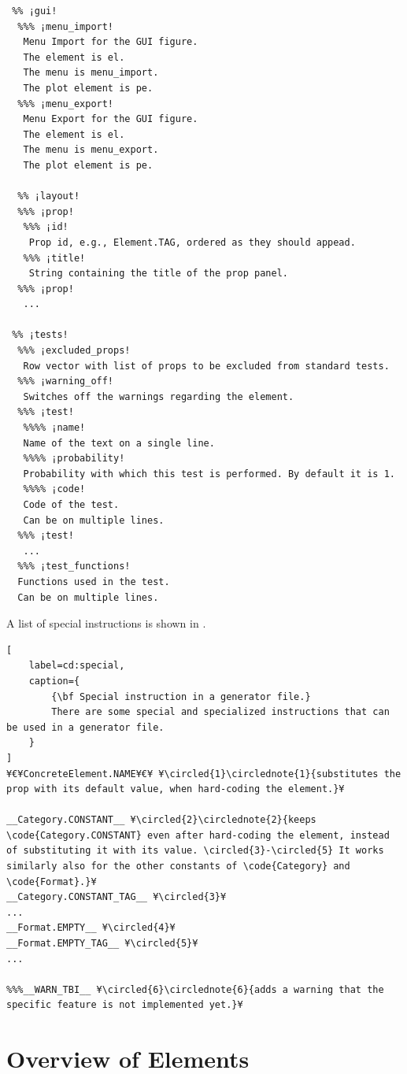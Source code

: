 \documentclass{tufte-handout}
\begin{document}
\begin{fullwidth}
\begin{lstlisting}
 %% ¡gui!
  %%% ¡menu_import!
   Menu Import for the GUI figure. 
   The element is el.
   The menu is menu_import.
   The plot element is pe.
  %%% ¡menu_export!
   Menu Export for the GUI figure. 
   The element is el.
   The menu is menu_export.
   The plot element is pe.

  %% ¡layout!
  %%% ¡prop!
   %%% ¡id!
    Prop id, e.g., Element.TAG, ordered as they should appead.
   %%% ¡title!
    String containing the title of the prop panel.
  %%% ¡prop!
   ...
  
 %% ¡tests!
  %%% ¡excluded_props!
   Row vector with list of props to be excluded from standard tests.
  %%% ¡warning_off!
   Switches off the warnings regarding the element.
  %%% ¡test!
   %%%% ¡name!
   Name of the text on a single line.
   %%%% ¡probability!
   Probability with which this test is performed. By default it is 1.
   %%%% ¡code!
   Code of the test.
   Can be on multiple lines.
  %%% ¡test!
   ...
  %%% ¡test_functions!
  Functions used in the test.
  Can be on multiple lines.
\end{lstlisting}
\end{fullwidth}

A list of special instructions is shown in .
%
\begin{lstlisting}[
	label=cd:special,
	caption={
		{\bf Special instruction in a generator file.}
		There are some special and specialized instructions that can be used in a generator file.
	}
]
¥€¥ConcreteElement.NAME¥€¥ ¥\circled{1}\circlednote{1}{substitutes the prop with its default value, when hard-coding the element.}¥

__Category.CONSTANT__ ¥\circled{2}\circlednote{2}{keeps \code{Category.CONSTANT} even after hard-coding the element, instead of substituting it with its value. \circled{3}-\circled{5} It works similarly also for the other constants of \code{Category} and \code{Format}.}¥
__Category.CONSTANT_TAG__ ¥\circled{3}¥
...
__Format.EMPTY__ ¥\circled{4}¥
__Format.EMPTY_TAG__ ¥\circled{5}¥
...

%%%__WARN_TBI__ ¥\circled{6}\circlednote{6}{adds a warning that the specific feature is not implemented yet.}¥
\end{lstlisting}

\section{Overview of Elements}
\end{document}
